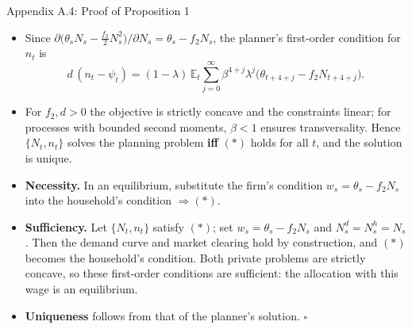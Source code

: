 \documentclass[10pt]{beamer}
\newcommand{\E}{\mathbb{E}}
\begin{document}
\begin{frame}{Appendix A.4: Proof of Proposition 1}
  \small
  \begin{itemize}
    \item Since $\partial\big(\theta_sN_s-\tfrac{f_2}{2}N_s^2\big)/\partial N_s=\theta_s-f_2N_s$, the planner's first-order condition for $n_t$ is
      \[ d\,(n_t-\psi_t)=(1-\lambda)\,\E_t\sum_{j=0}^\infty\beta^{4+j}\lambda^j\big(\theta_{t+4+j}-f_2N_{t+4+j}\big). \tag{$\ast$} \]
    \item For $f_2,d>0$ the objective is strictly concave and the constraints linear; for processes with bounded second moments, $\beta<1$ ensures transversality. Hence $\{N_t,n_t\}$ solves the planning problem \textbf{iff} $(\ast)$ holds for all $t$, and the solution is unique.
    \item \textbf{Necessity.} In an equilibrium, substitute the firm's condition $w_s=\theta_s-f_2N_s$ into the household's condition $\Rightarrow(\ast)$.
    \item \textbf{Sufficiency.} Let $\{N_t,n_t\}$ satisfy $(\ast)$; set $w_s=\theta_s-f_2N_s$ and $N^d_s=N^h_s=N_s$. Then the demand curve and market clearing hold by construction, and $(\ast)$ becomes the household's condition. Both private problems are strictly concave, so these first-order conditions are sufficient: the allocation with this wage is an equilibrium.
    \item \textbf{Uniqueness} follows from that of the planner's solution. \hfill$\square$
  \end{itemize}
\end{frame}
\end{document}
